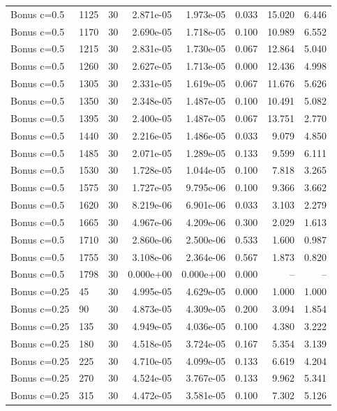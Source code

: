 \begin{scriptsize}
\begin{longtable}{llrrrrrr}
Bonus c=0.5 & 1125 & 30 & 2.871e-05 & 1.973e-05 & 0.033 & 15.020 & 6.446 \\
Bonus c=0.5 & 1170 & 30 & 2.690e-05 & 1.718e-05 & 0.100 & 10.989 & 6.552 \\
Bonus c=0.5 & 1215 & 30 & 2.831e-05 & 1.730e-05 & 0.067 & 12.864 & 5.040 \\
Bonus c=0.5 & 1260 & 30 & 2.627e-05 & 1.713e-05 & 0.000 & 12.436 & 4.998 \\
Bonus c=0.5 & 1305 & 30 & 2.331e-05 & 1.619e-05 & 0.067 & 11.676 & 5.626 \\
Bonus c=0.5 & 1350 & 30 & 2.348e-05 & 1.487e-05 & 0.100 & 10.491 & 5.082 \\
Bonus c=0.5 & 1395 & 30 & 2.400e-05 & 1.487e-05 & 0.067 & 13.751 & 2.770 \\
Bonus c=0.5 & 1440 & 30 & 2.216e-05 & 1.486e-05 & 0.033 & 9.079 & 4.850 \\
Bonus c=0.5 & 1485 & 30 & 2.071e-05 & 1.289e-05 & 0.133 & 9.599 & 6.111 \\
Bonus c=0.5 & 1530 & 30 & 1.728e-05 & 1.044e-05 & 0.100 & 7.818 & 3.265 \\
Bonus c=0.5 & 1575 & 30 & 1.727e-05 & 9.795e-06 & 0.100 & 9.366 & 3.662 \\
Bonus c=0.5 & 1620 & 30 & 8.219e-06 & 6.901e-06 & 0.033 & 3.103 & 2.279 \\
Bonus c=0.5 & 1665 & 30 & 4.967e-06 & 4.209e-06 & 0.300 & 2.029 & 1.613 \\
Bonus c=0.5 & 1710 & 30 & 2.860e-06 & 2.500e-06 & 0.533 & 1.600 & 0.987 \\
Bonus c=0.5 & 1755 & 30 & 3.108e-06 & 2.364e-06 & 0.567 & 1.873 & 0.820 \\
Bonus c=0.5 & 1798 & 30 & 0.000e+00 & 0.000e+00 & 0.000 & -- & -- \\
Bonus c=0.25 & 45 & 30 & 4.995e-05 & 4.629e-05 & 0.000 & 1.000 & 1.000 \\
Bonus c=0.25 & 90 & 30 & 4.873e-05 & 4.309e-05 & 0.200 & 3.094 & 1.854 \\
Bonus c=0.25 & 135 & 30 & 4.949e-05 & 4.036e-05 & 0.100 & 4.380 & 3.222 \\
Bonus c=0.25 & 180 & 30 & 4.518e-05 & 3.724e-05 & 0.167 & 5.354 & 3.139 \\
Bonus c=0.25 & 225 & 30 & 4.710e-05 & 4.099e-05 & 0.133 & 6.619 & 4.204 \\
Bonus c=0.25 & 270 & 30 & 4.524e-05 & 3.767e-05 & 0.133 & 9.962 & 5.341 \\
Bonus c=0.25 & 315 & 30 & 4.472e-05 & 3.581e-05 & 0.100 & 7.302 & 5.126 \\

\end{longtable}
\end{scriptsize}
